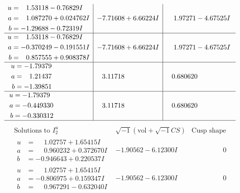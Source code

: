 \documentclass[1p]{elsarticle_modified}
\theoremstyle{definition}
\newcommand{\I}{\sqrt{-1}}
\begin{document}
$$\begin{array}{c|c|c}
\begin{aligned}
u &= \phantom{-}1.53118 - 0.76829 I \\
a &= \phantom{-}1.087270 + 0.024762 I \\
b &= -1.29688 - 0.72319 I\end{aligned}
 & -7.71608 + 6.66224 I & \phantom{-}1.97271 - 4.67525 I \\ \hline\begin{aligned}
u &= \phantom{-}1.53118 - 0.76829 I \\
a &= -0.370249 - 0.191551 I \\
b &= \phantom{-}0.857555 + 0.908378 I\end{aligned}
 & -7.71608 + 6.66224 I & \phantom{-}1.97271 - 4.67525 I \\ \hline\begin{aligned}
u &= -1.79379\phantom{ +0.000000I} \\
a &= \phantom{-}1.21437\phantom{ +0.000000I} \\
b &= -1.39851\phantom{ +0.000000I}\end{aligned}
 & \phantom{-}3.11718\phantom{ +0.000000I} & \phantom{-}0.680620\phantom{ +0.000000I} \\ \hline\begin{aligned}
u &= -1.79379\phantom{ +0.000000I} \\
a &= -0.449330\phantom{ +0.000000I} \\
b &= -0.330312\phantom{ +0.000000I}\end{aligned}
 & \phantom{-}3.11718\phantom{ +0.000000I} & \phantom{-}0.680620\phantom{ +0.000000I}\\
 \hline 
 \end{array}$$\newpage$$\begin{array}{c|c|c}  
\text{Solutions to }I^u_{2}& \I (\text{vol} + \sqrt{-1}CS) & \text{Cusp shape}\\
 \hline 
\begin{aligned}
u &= \phantom{-}1.02757 + 1.65415 I \\
a &= \phantom{-}0.960232 + 0.372670 I \\
b &= -0.946643 + 0.220537 I\end{aligned}
 & -1.90562 - 6.12300 I & \phantom{-0.000000 } 0 \\ \hline\begin{aligned}
u &= \phantom{-}1.02757 + 1.65415 I \\
a &= -0.806975 + 0.159347 I \\
b &= \phantom{-}0.967291 - 0.632040 I\end{aligned}
 & -1.90562 - 6.12300 I & \phantom{-0.000000 } 0 \\ \hline\begin{aligned}

\end{aligned}
\end{array}$$
\end{document}
